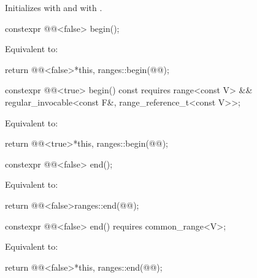 \begin{itemdescr}
\pnum
\effects
Initializes  with  and
 with .
\end{itemdescr}

%
\begin{itemdecl}
constexpr @@<false> begin();
\end{itemdecl}

\begin{itemdescr}
\pnum
\effects
Equivalent to:
\begin{codeblock}
return @@<false>{*this, ranges::begin(@@)};
\end{codeblock}
\end{itemdescr}

%
\begin{itemdecl}
constexpr @@<true> begin() const
  requires range<const V> &&
           regular_invocable<const F&, range_reference_t<const V>>;
\end{itemdecl}

\begin{itemdescr}
\pnum
\effects
Equivalent to:
\begin{codeblock}
return @@<true>{*this, ranges::begin(@@)};
\end{codeblock}
\end{itemdescr}

%
\begin{itemdecl}
constexpr @@<false> end();
\end{itemdecl}

\begin{itemdescr}
\pnum
\effects
Equivalent to:
\begin{codeblock}
return @@<false>{ranges::end(@@)};
\end{codeblock}
\end{itemdescr}

%
\begin{itemdecl}
constexpr @@<false> end() requires common_range<V>;
\end{itemdecl}

\begin{itemdescr}
\pnum
\effects
Equivalent to:
\begin{codeblock}
return @@<false>{*this, ranges::end(@@)};
\end{codeblock}
\end{itemdescr}


